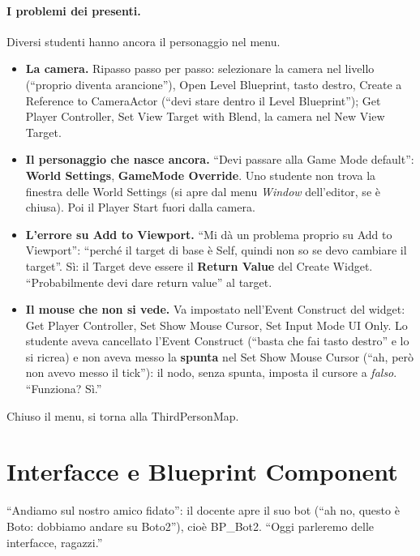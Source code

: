 \paragraph{I problemi dei presenti.} Diversi studenti hanno ancora il personaggio nel
menu.
\begin{itemize}
  \item \textbf{La camera.} Ripasso passo per passo: selezionare la camera nel livello
        (``proprio diventa arancione''), Open Level Blueprint, tasto destro, Create a
        Reference to CameraActor (``devi stare dentro il Level Blueprint''); Get Player
        Controller, Set View Target with Blend, la camera nel New View Target.
  \item \textbf{Il personaggio che nasce ancora.} ``Devi passare alla Game Mode
        default'': \textbf{World Settings}, \textbf{GameMode Override}. Uno studente non
        trova la finestra delle World Settings (si apre dal menu \emph{Window} dell'editor,
        se è chiusa). Poi il Player Start fuori dalla camera.
  \item \textbf{L'errore su Add to Viewport.} ``Mi dà un problema proprio su Add to
        Viewport'': ``perché il target di base è Self, quindi non so se devo cambiare il
        target''. Sì: il Target deve essere il \textbf{Return Value} del Create Widget.
        ``Probabilmente devi dare return value'' al target.
  \item \textbf{Il mouse che non si vede.} Va impostato nell'Event Construct del widget:
        Get Player Controller, Set Show Mouse Cursor, Set Input Mode UI Only. Lo studente
        aveva cancellato l'Event Construct (``basta che fai tasto destro'' e lo si ricrea)
        e non aveva messo la \textbf{spunta} nel Set Show Mouse Cursor (``ah, però non
        avevo messo il tick''): il nodo, senza spunta, imposta il cursore a \emph{falso}.
        ``Funziona? Sì.''
\end{itemize}
Chiuso il menu, si torna alla ThirdPersonMap.

\section{Interfacce e Blueprint Component}
\label{ue12:sec:concetti}

``Andiamo sul nostro amico fidato'': il docente apre il suo bot (``ah no, questo è Boto:
dobbiamo andare su Boto2''), cioè BP\_Bot2. ``Oggi parleremo delle interfacce, ragazzi.''

